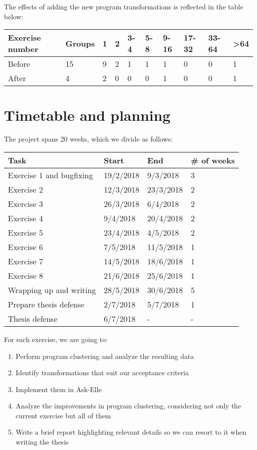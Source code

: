 \documentclass[a4paperpaper,]{report}
\providecommand{\tightlist}{%
  \setlength{\itemsep}{0pt}\setlength{\parskip}{0pt}}
\begin{document}
The effects of adding the new program transformations is reflected in
the table below:

\begin{longtable}[]{@{}llllllllll@{}}
\toprule
Exercise number & Groups & 1 & 2 & 3-4 & 5-8 & 9-16 & 17-32 & 33-64 &
\textgreater{}64\tabularnewline
\midrule
\endhead
Before & 15 & 9 & 2 & 1 & 1 & 1 & 0 & 0 & 1\tabularnewline
After & 4 & 2 & 0 & 0 & 0 & 1 & 0 & 0 & 1\tabularnewline
\bottomrule
\end{longtable}

\hypertarget{timetable-and-planning}{%
\chapter{Timetable and planning}\label{timetable-and-planning}}

The project spans 20 weeks, which we divide as follows:

\begin{longtable}[]{@{}llll@{}}
\toprule
Task & Start & End & \# of weeks\tabularnewline
\midrule
\endhead
Exercise 1 and bugfixing & 19/2/2018 & 9/3/2018 & 3\tabularnewline
Exercise 2 & 12/3/2018 & 23/3/2018 & 2\tabularnewline
Exercise 3 & 26/3/2018 & 6/4/2018 & 2\tabularnewline
Exercise 4 & 9/4/2018 & 20/4/2018 & 2\tabularnewline
Exercise 5 & 23/4/2018 & 4/5/2018 & 2\tabularnewline
Exercise 6 & 7/5/2018 & 11/5/2018 & 1\tabularnewline
Exercise 7 & 14/5/2018 & 18/6/2018 & 1\tabularnewline
Exercise 8 & 21/6/2018 & 25/6/2018 & 1\tabularnewline
Wrapping up and writing & 28/5/2018 & 30/6/2018 & 5\tabularnewline
Prepare thesis defense & 2/7/2018 & 5/7/2018 & 1\tabularnewline
Thesis defense & 6/7/2018 & - & -\tabularnewline
\bottomrule
\end{longtable}

For each exercise, we are going to:

\begin{enumerate}
\def\labelenumi{\arabic{enumi}.}
\tightlist
\item
  Perform program clustering and analyze the resulting data
\item
  Identify transformations that suit our acceptance criteria
\item
  Implement them in Ask-Elle
\item
  Analyze the improvements in program clustering, considering not only
  the current exercise but all of them
\item
  Write a brief report highlighting relevant details so we can resort to
  it when writing the thesis
\end{enumerate}
\end{document}

